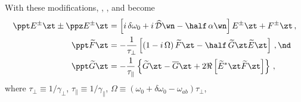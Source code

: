 With these modifications, , , and  become
\begin{subequations}\label{eqn:laser_statics_1d_sml_scaled}
  \begin{align}
    \label{eqn:cw_sml_etz_scaled}
    \ppt E^\pm\zt \pm \ppz E^\pm\zt &= \left[ i\, \delta \omega_0 + i\, \widehat{\mathcal{D}}\wn - \half\, \alpha\wn \right] E^\pm\zt + F^\pm\zt\, , \\
    \label{eqn:cw_sml_ftz_scaled_lor} \ppt \widetilde{F}\zt &= -\frac{1}{\tau_\perp} \left[ \left( 1 - i\, \Omega \right) \widetilde{F}\zt - \half\, \widetilde{G}\zt \widetilde{E}\zt \right]\, , \nd \\
    \label{eqn:cw_sml_gtz_scaled} \ppt \widetilde{G}\zt &= -\frac{1}{\tau_\parallel} \left\{ \widetilde{G}\zt - \overline{G}\zt + 2 \Re \left[ \widetilde{E}^\ast\zt \widetilde{F}\zt \right] \right\}\, ,
  \end{align}
\end{subequations}
where $\tau_\perp \equiv 1/\gamma_\perp$, $\tau_\parallel \equiv 1/\gamma_\parallel$, $\Omega \equiv (\omega_0 + \delta \omega_0 - \omega_{a b}) \tau_\perp$,
